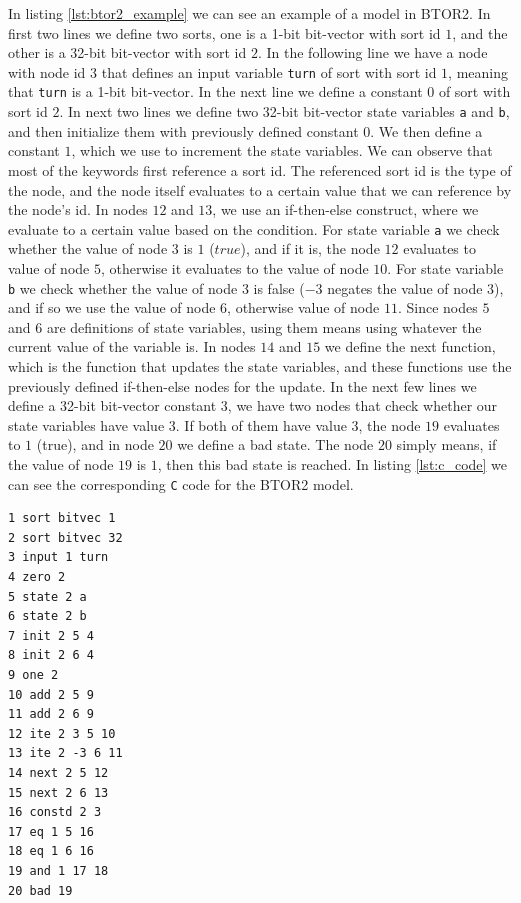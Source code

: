 \documentclass[12pt]{article}
\begin{document}
In listing \ref{lst:btor2_example} we can see an example of a model in BTOR2.
In first two lines we define two sorts, one is a 1-bit bit-vector with sort id
$1$, and the other is a 32-bit bit-vector with sort id $2$. In the following
line we have a node with node id $3$ that defines an input variable
\texttt{turn} of sort with sort id $1$, meaning that \texttt{turn} is a 1-bit
bit-vector. In the next line we define a constant $0$ of sort with sort id $2$.
In next two lines we define two 32-bit bit-vector state variables \texttt{a}
and \texttt{b}, and then initialize them with previously defined constant $0$.
We then define a constant $1$, which we use to increment the state variables.
We can observe that most of the keywords first reference a sort id. The
referenced sort id is the type of the node, and the node itself evaluates to a
certain value that we can reference by the node's id. In nodes $12$ and $13$,
we use an if-then-else construct, where we evaluate to a certain value based on
the condition. For state variable \texttt{a} we check whether the value of node
$3$ is $1$ ($true$), and if it is, the node $12$ evaluates to value of node
$5$, otherwise it evaluates to the value of node $10$. For state variable
\texttt{b} we check whether the value of node $3$ is false ($-3$ negates the
value of node $3$), and if so we use the value of node $6$, otherwise value of
node $11$. Since nodes $5$ and $6$ are definitions of state variables, using
them means using whatever the current value of the variable is. In nodes $14$
and $15$ we define the next function, which is the function that updates the
state variables, and these functions use the previously defined if-then-else
nodes for the update. In the next few lines we define a 32-bit bit-vector
constant $3$, we have two nodes that check whether our state variables have
value $3$. If both of them have value $3$, the node $19$ evaluates to $1$
(true), and in node $20$ we define a bad state. The node $20$ simply means, if
the value of node $19$ is $1$, then this bad state is reached. In listing
\ref{lst:c_code} we can see the corresponding \texttt{C} code for the BTOR2
model.

\begin{lstlisting}[label=lst:btor2_example, caption={Example BTOR2 model for \texttt{C} code in listing \ref{lst:c_code}},captionpos=b]
1 sort bitvec 1
2 sort bitvec 32
3 input 1 turn
4 zero 2
5 state 2 a
6 state 2 b
7 init 2 5 4
8 init 2 6 4
9 one 2
10 add 2 5 9
11 add 2 6 9
12 ite 2 3 5 10
13 ite 2 -3 6 11
14 next 2 5 12
15 next 2 6 13
16 constd 2 3
17 eq 1 5 16
18 eq 1 6 16
19 and 1 17 18
20 bad 19
\end{lstlisting}
\end{document}
